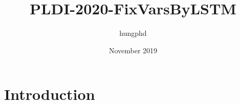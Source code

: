 \documentclass{article}
\title{PLDI-2020-FixVarsByLSTM}
\author{hungphd }
\date{November 2019}
\begin{document}
\maketitle

\section{Introduction}
\end{document}
